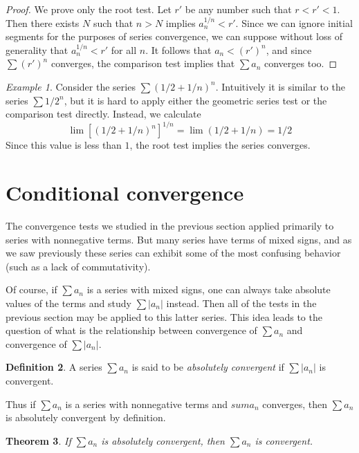 \documentclass[11pt,oneside]{amsbook}
\theoremstyle{definition}
\theoremstyle{plain}
\newtheorem{thm}{Theorem}[section]
\theoremstyle{definition}
\newtheorem{defn}[thm]{Definition}
\theoremstyle{remark}
\newtheorem{example}[thm]{Example}
\numberwithin{equation}{section}
\numberwithin{figure}{section}
\begin{document}
\begin{proof}
  We prove only the root test. Let $r'$ be any number such that $r<r'<1$. Then there exists $N$ such that $n>N$ implies $a_n^{1/n}<r'$. Since we can ignore initial segments for the purposes of series convergence, we can suppose without loss of generality that $a_n^{1/n}<r'$ for all $n$. It follows that $a_n<(r')^n$, and since $\sum (r')^n$ converges, the comparison test implies that $\sum a_n$ converges too.
\end{proof}

\begin{example}
  Consider the series $\sum(1/2+1/n)^n$. Intuitively it is similar to the series $\sum1/2^n$, but it is hard to apply either the geometric series test or the comparison test directly. Instead, we calculate
  \[\lim[(1/2+1/n)^n]^{1/n}=\lim(1/2+1/n)=1/2
  \]
  Since this value is less than $1$, the root test implies the series converges.
\end{example}

\newpage
\section{Conditional convergence}

The convergence tests we studied in the previous section applied primarily to series with nonnegative terms. But many series have terms of mixed signs, and as we saw previously these series can exhibit some of the most confusing behavior (such as a lack of commutativity).

Of course, if $\sum a_n$ is a series with mixed signs, one can always take absolute values of the terms and study $\sum|a_n|$ instead. Then all of the tests in the previous section may be applied to this latter series. This idea leads to the question of what is the relationship between convergence of $\sum a_n$ and convergence of $\sum|a_n|$.

\begin{defn}
  A series $\sum a_n$ is said to be \emph{absolutely convergent} if $\sum |a_n|$ is convergent.
\end{defn}

Thus if $\sum a_n$ is a series with nonnegative terms and $sum a_n$ converges, then $\sum a_n$ is absolutely convergent by definition. 

\begin{thm}
  \label{thm:absolute}
  If $\sum a_n$ is absolutely convergent, then $\sum a_n$ is convergent.
\end{thm}
\end{document}
